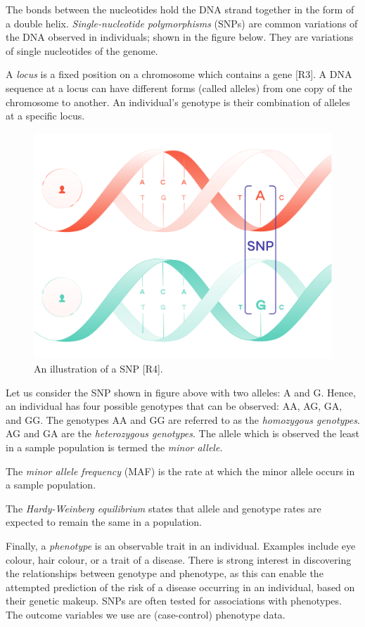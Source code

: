 \documentclass[
]{article}
\begin{document}
The bonds between the nucleotides hold the DNA strand together in the
form of a double helix. \textit{Single-nucleotide polymorphisms} (SNPs)
are common variations of the DNA observed in individuals; shown in the
figure below. They are variations of single nucleotides of the genome.

A \textit{locus} is a fixed position on a chromosome which contains a
gene {[}R3{]}. A DNA sequence at a locus can have different forms
(called alleles) from one copy of the chromosome to another. An
individual's genotype is their combination of alleles at a specific
locus.

\begin{figure}
\centering
\includegraphics{images/snp.png}
\caption{An illustration of a SNP {[}R4{]}.}
\end{figure}

Let us consider the SNP shown in figure above with two alleles: A and G.
Hence, an individual has four possible genotypes that can be observed:
AA, AG, GA, and GG. The genotypes AA and GG are referred to as the
\textit{homozygous genotypes}. AG and GA are the
\textit{heterozygous genotypes}. The allele which is observed the least
in a sample population is termed the \textit{minor allele}.

The \textit{minor allele frequency} (MAF) is the rate at which the minor
allele occurs in a sample population.

The \textit{Hardy-Weinberg equilibrium} states that allele and genotype
rates are expected to remain the same in a population.

Finally, a \textit{phenotype} is an observable trait in an individual.
Examples include eye colour, hair colour, or a trait of a disease. There
is strong interest in discovering the relationships between genotype and
phenotype, as this can enable the attempted prediction of the risk of a
disease occurring in an individual, based on their genetic makeup. SNPs
are often tested for associations with phenotypes. The outcome variables
we use are (case-control) phenotype data.
\end{document}
